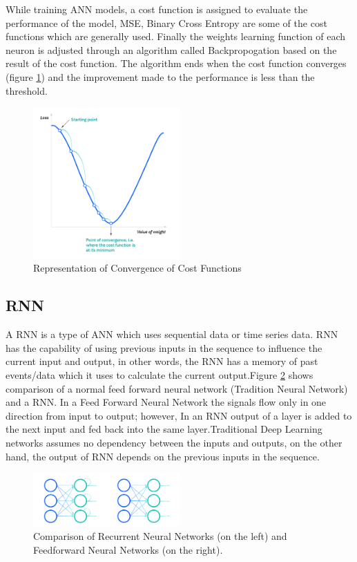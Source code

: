 \documentclass[twoside,11pt,a4paper]{article}
\begin{document}
While training \acs{ANN} models, a cost function is assigned to evaluate the performance of the model, \acf{MSE}, Binary Cross Entropy are some of the cost functions which are generally used. Finally the weights learning function of each neuron is adjusted through an algorithm called Backpropogation based on the result of the cost function. The algorithm ends when the cost function converges (figure \ref{fig:cost_function}) and the improvement made to the performance is less than the threshold.
\begin{figure}[ht]
	\centering
	\includegraphics[width=0.5\textwidth]{cost_function}
	\caption[Representation of Convergence of Cost Functions]{Representation of Convergence of Cost Functions\citep{ibm2022neural}}
	\label{fig:cost_function}
\end{figure}

\subsection{\acf{RNN}}
A \acf{RNN} is a type of \acs{ANN} which uses sequential data or time series data. \acs{RNN} has the capability of using previous inputs in the sequence to influence the current input and output, in other words, the \acs{RNN} has a memory of past events/data which it uses to calculate the current output.Figure \ref{fig:rnn_nn} shows comparison of a normal feed forward neural network (Tradition Neural Network)  and a \acs{RNN}. In a Feed Forward Neural Network the signals flow only in one direction from input to output; however, In an \acs{RNN} output of a layer is added to the next input and fed back into the same layer.Traditional Deep Learning networks assumes no dependency between the inputs and outputs, on the other hand, the output of \acs{RNN} depends on the previous inputs in the sequence.
\begin{figure}[ht]
	\centering
	\includegraphics[width=0.5\textwidth]{rnn_nn}
	\caption[Comparison of Recurrent Neural Networks (on the left) and Feedforward Neural Networks (on the right)]{Comparison of Recurrent Neural Networks (on the left) and Feedforward Neural Networks (on the right)\citep{ibm2022rnn}.}
	\label{fig:rnn_nn}
\end{figure}
\end{document}
